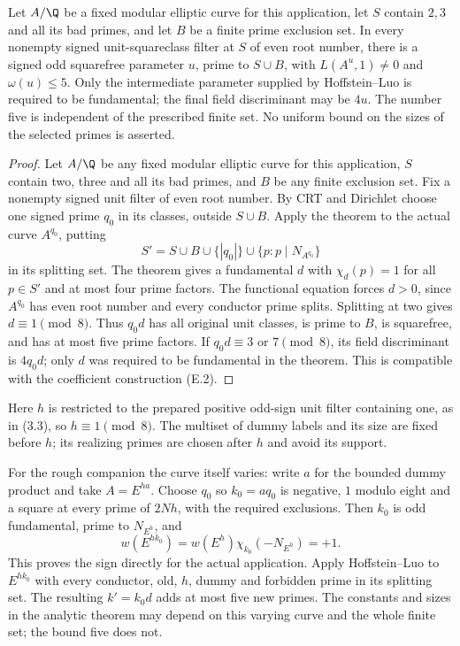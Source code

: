 \begin{proposition}\label{ex:app-five-prime}
Let $A/\Q$ be a fixed modular elliptic curve for this application,
let $S$ contain $2,3$ and all its bad primes, and let $B$ be a finite
prime exclusion set. In every nonempty signed unit-squareclass filter
at $S$ of even root number, there is a signed odd squarefree parameter
$u$, prime to $S\cup B$, with $L(A^u,1)\ne0$ and $\omega(u)\le5$.
Only the intermediate parameter supplied by Hoffstein--Luo is required
to be fundamental; the final field discriminant may be $4u$.
The number five is independent of the prescribed finite set. No
uniform bound on the sizes of the selected primes is asserted.
\end{proposition}
\begin{proof}\leavevmode
Let $A/\Q$ be any fixed modular elliptic curve for this application,
$S$ contain two, three and all its bad primes, and $B$ be any finite
exclusion set. Fix a nonempty signed unit filter of even root number.
By CRT and Dirichlet choose one signed prime $q_0$ in its classes,
outside $S\cup B$. Apply the theorem to the actual curve $A^{q_0}$,
putting
\[
                 S'=S\cup B\cup\{|q_0|\}\cup
                               \{p:p\mid N_{A^{q_0}}\}
\]
in its splitting set. The theorem gives a fundamental $d$ with
$\chi_d(p)=1$ for all $p\in S'$ and at most four prime factors.
The functional equation forces $d>0$, since $A^{q_0}$ has even
root number and every conductor prime splits. Splitting at two
gives $d\equiv1\pmod8$. Thus $q_0d$ has all original unit
classes, is prime to $B$, is squarefree, and has at most five
prime factors. If $q_0d\equiv3$ or $7\pmod8$, its field
discriminant is $4q_0d$; only $d$ was required to be fundamental
in the theorem. This is compatible with the coefficient
construction (E.2).
\end{proof}

Here $h$ is restricted to the prepared positive odd-sign unit
filter containing one, as in (3.3), so $h\equiv1\pmod8$.
The multiset of dummy labels and its size are fixed before $h$;
its realizing primes are chosen after $h$ and avoid its support.

For the rough companion the curve itself varies:
write $a$ for the bounded dummy product and take $A=E^{ha}$.
Choose $q_0$ so $k_0=aq_0$ is negative, $1$ modulo eight and
a square at every prime of $2Nh$, with the required exclusions.
Then $k_0$ is odd fundamental, prime to $N_{E^h}$, and
\[
          w(E^{hk_0})=w(E^h)\chi_{k_0}(-N_{E^h})=+1.
\]
This proves the sign directly for the actual application.
Apply Hoffstein--Luo to $E^{hk_0}$ with every conductor,
old, $h$, dummy and forbidden prime in its splitting set.
The resulting $k'=k_0d$ adds at most five new primes.
The constants and sizes in the analytic theorem may depend on
this varying curve and the whole finite set; the bound five does not.

